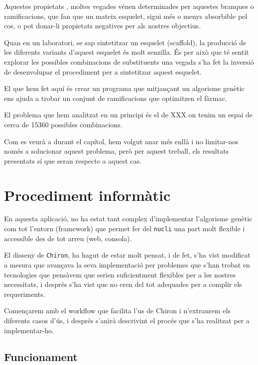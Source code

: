 	Aquestes propietats , moltes vegades vénen determinades per aquestes
	branques o ramificacions, que fan que un mateix esquelet, sigui més o menys
	absorbible pel cos, o pot donar-li propietats negatives per als nostres
	objectius.

	Quan en un laboratori, se sap sintetitzar un esquelet (scaffold), la
	producció de les diferents variants d'aquest esquelet és molt senzilla.  És
	per això que té sentit explorar les possibles combinacions de substituents 
        una vegada s'ha fet la inversió de desenvolupar el procediment per a
        sintetitzar aquest esquelet.

	El que hem fet aquí és crear un programa que mitjançant un algorisme
	genètic ens ajuda a trobar un conjunt de ramificacions que optimitzen el
	fàrmac.

	El problema que hem analitzat en un principi és el de XXX
	on tenim un espai de cerca de 15360 possibles combinacions.

	Com es veurà a durant el capítol, hem volgut anar més enllà i no limitar-nos
	només a solucionar aquest problema, però per aquest treball, els resultats
	presentats sí que seran respecte a aquest cas.

\section{Procediment informàtic} %
\label{sec:Procediment informatic}

En aquesta aplicació, no ha estat tant complex d'implementar l'algorisme genètic
com tot l'entorn (framework) que permet fer del \texttt{nucli} una part molt
flexible i accessible des de tot arreu (web, consola).

El disseny de \texttt{Chiron}, ha hagut de estar molt pensat, i de fet, s'ha vist
modificat a mesura que avançava la seva implementació per problemes que s'han
trobat en tecnologies que pensàvem que serien suficientment flexibles per a les
nostres necessitats, i després s'ha vist que no eren del tot adequades per a
complir els requeriments.

Començarem amb el workflow que facilita l'us de Chiron i n'extraurem els
diferents casos d'ús, i després s'anirà descrivint el procés que s'ha realitzat
per a implementar-ho.

\subsection{Funcionament} %
\label{sub:Funcionament}

